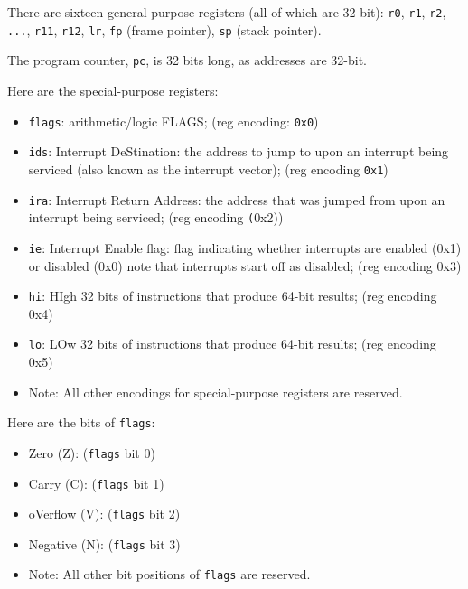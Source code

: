 \documentclass{article}
\begin{document}
	\doublespacing
	There are sixteen general-purpose registers (all of which are 32-bit):
	\texttt{r0}, \texttt{r1},
	\texttt{r2}, \texttt{...}, \texttt{r11}, \texttt{r12}, \texttt{lr},
	\texttt{fp} (frame pointer), \texttt{sp} (stack pointer).

	The program counter, \texttt{pc}, is 32 bits long, as addresses are
	32-bit.

	Here are the special-purpose registers:
	\singlespacing
	\begin{itemize}
	\item \texttt{flags}: arithmetic/logic FLAGS;
		(reg encoding: \texttt{0x0})
	\item \texttt{ids}: Interrupt DeStination:
		the address to jump to upon an interrupt
		being serviced (also known as the interrupt vector);
		(reg encoding \texttt{0x1})
	\item \texttt{ira}: Interrupt Return Address:
		the address that was jumped from upon an interrupt being
			serviced;
		(reg encoding \texttt(0x2))
	\item \texttt{ie}: Interrupt Enable flag:
		flag indicating whether interrupts are
			enabled (0x1) or disabled (0x0)
		note that interrupts start off as disabled;
		(reg encoding 0x3)
	\item \texttt{hi}:
		HIgh 32 bits of instructions that produce 64-bit results;
		(reg encoding 0x4)
	\item \texttt{lo}:
		LOw 32 bits of instructions that produce 64-bit results;
		(reg encoding 0x5)
	\item Note:
		All other encodings for special-purpose registers are reserved.
	\end{itemize}
	\doublespacing
	Here are the bits of \texttt{flags}:
	\singlespacing
	\begin{itemize}
	\item Zero (Z): (\texttt{flags} bit 0)
	\item Carry (C): (\texttt{flags} bit 1)
	\item oVerflow (V): (\texttt{flags} bit 2)
	\item Negative (N): (\texttt{flags} bit 3)
	\item Note:
		All other bit positions of \texttt{flags} are reserved.
	\end{itemize}

\end{document}
